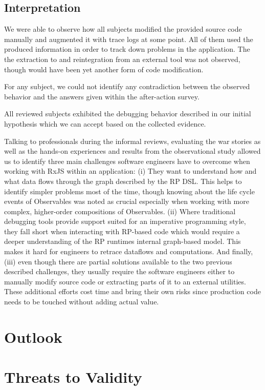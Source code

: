 \documentclass[12pt,a4paper]{article}
\begin{document}
\subsection{Interpretation}

We were able to observe how all subjects modified the provided source code manually and augmented it with trace logs at some point. All of them used the produced information in order to track down problems in the application. The the extraction to and reintegration from an external tool was not observed, though would have been yet another form of code modification.

For any subject, we could not identify any contradiction between the observed behavior and the answers given within the after-action survey.

All reviewed subjects exhibited the debugging behavior described in our initial hypothesis which we can accept based on the collected evidence.

Talking to professionals during the informal reviews, evaluating the war stories as well as the hands-on experiences and results from the observational study allowed us to identify three main challenges software engineers have to overcome when working with RxJS within an application: (i) They want to understand how and what data flows through the graph described by the RP DSL. This helps to identify simpler problems most of the time, though knowing about the life cycle events of Observables was noted as crucial especially when working with more complex, higher-order compositions of Observables. (ii) Where traditional debugging tools provide support suited for an imperative programming style, they fall short when interacting with RP-based code which would require a deeper understanding of the RP runtimes internal graph-based model. This makes it hard for engineers to retrace dataflows and computations. And finally, (iii) even though there are partial solutions available to the two previous described challenges, they usually require the software engineers either to manually modify source code or extracting parts of it to an external utilities. These additional efforts cost time and bring their own risks since production code needs to be touched without adding actual value.


\section{Outlook}
\label{sec:future}


\section{Threats to Validity}
\label{sec:threats}
\end{document}
